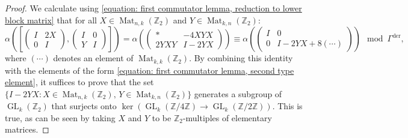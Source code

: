 \documentclass[10pt,a4paper]{amsart}
\DeclareMathOperator{\GL}{GL}
\DeclareMathOperator{\Mat}{Mat}
\newcommand{\Z}{\mathbb{Z}}
\begin{document}
\begin{proof}
    We calculate using \eqref{equation: first commutator lemma, reduction to lower block matrix} that for all $X\in \Mat_{n,k}(\Z_2)$ and $Y\in \Mat_{k,n}(\Z_2)$:
    \[
    \alpha\left(\left[ 
    \begin{pmatrix}I & 2X \\ 0 & I \end{pmatrix},
    \begin{pmatrix}I & 0 \\ Y & I \end{pmatrix}
    \right]\right)=
    \alpha\left(\begin{pmatrix}* & -4XYX \\ 2YXY & I-2YX \end{pmatrix}\right) \equiv 
    \alpha\left(\begin{pmatrix}I & 0 \\ 0 & I-2YX+ 8(\cdots) \end{pmatrix} \right)
    \mod \Gamma^{\mathrm{der}}
    ,
    \]
    where $(\cdots)$ denotes an element of $\Mat_{k,k}(\Z_2)$.
    By combining this identity with the elements of the form \eqref{equation: first commutator lemma, second type element}, it suffices to prove that the set $\{I-2YX\colon X\in \Mat_{n,k}(\Z_2), \,Y\in\Mat_{k,n}(\Z_2)\}$ generates a subgroup of $\GL_k(\Z_2)$ that surjects onto $\ker(\GL_k(\Z/4\Z)\rightarrow \GL_k(\Z/2\Z))$.  
    This is true, as can be seen by taking $X$ and $Y$ to be $\Z_2$-multiples of elementary matrices.
\end{proof}
\end{document}
